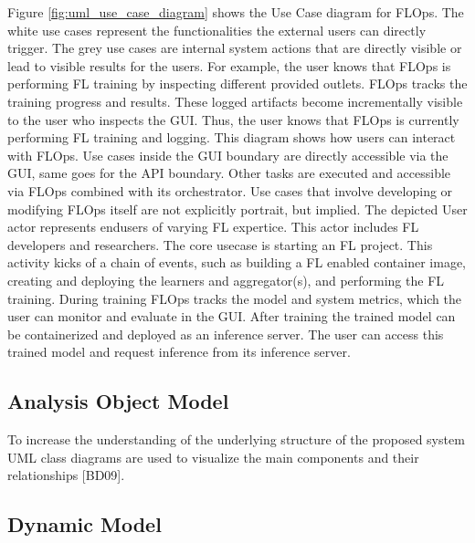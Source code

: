Figure \ref{fig:uml_use_case_diagram} shows the Use Case diagram for FLOps.
The white use cases represent the functionalities the external users can directly trigger.
The grey use cases are internal system actions that are directly visible or lead to visible results for the users.
For example, the user knows that FLOps is performing FL training by inspecting different provided outlets.
FLOps tracks the training progress and results.
These logged artifacts become incrementally visible to the user who inspects the GUI.
Thus, the user knows that FLOps is currently performing FL training and logging.
This diagram shows how users can interact with FLOps.
Use cases inside the GUI boundary are directly accessible via the GUI, same goes for the API boundary.
Other tasks are executed and accessible via FLOps combined with its orchestrator.
Use cases that involve developing or modifying FLOps itself are not explicitly portrait, but implied.
The depicted User actor represents endusers of varying FL expertice.
This actor includes FL developers and researchers.
The core usecase is starting an FL project.
This activity kicks of a chain of events, such as building a FL enabled container image, creating and deploying the learners and aggregator(s), and performing the FL training.
During training FLOps tracks the model and system metrics, which the user can monitor and evaluate in the GUI.
After training the trained model can be containerized and deployed as an inference server.
The user can access this trained model and request inference from its inference server.



\subsection{Analysis Object Model}
To increase the understanding of the underlying structure of the proposed
system UML class diagrams are used to visualize the main components and
their relationships [BD09].

\subsection{Dynamic Model}
